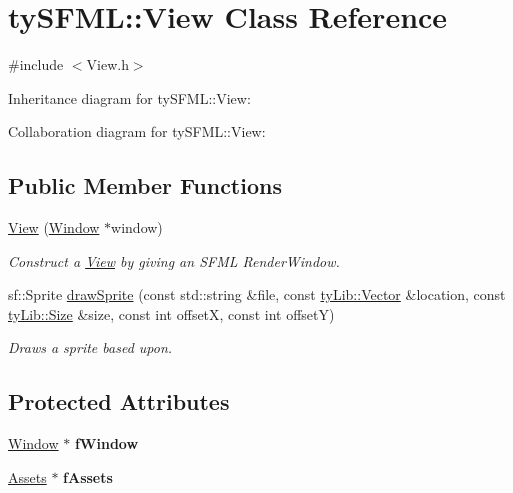 \hypertarget{classty_s_f_m_l_1_1_view}{}\section{ty\+S\+F\+M\+L\+:\+:View Class Reference}
\label{classty_s_f_m_l_1_1_view}


{\ttfamily \#include $<$View.\+h$>$}



Inheritance diagram for ty\+S\+F\+M\+L\+:\+:View\+:


Collaboration diagram for ty\+S\+F\+M\+L\+:\+:View\+:
\subsection*{Public Member Functions}
\begin{DoxyCompactItemize}
\item 
\hypertarget{classty_s_f_m_l_1_1_view_aa3e1b67002328cf57ef8cb55e259bca3}{}\hyperlink{classty_s_f_m_l_1_1_view_aa3e1b67002328cf57ef8cb55e259bca3}{View} (\hyperlink{classty_s_f_m_l_1_1_window}{Window} $\ast$window)\label{classty_s_f_m_l_1_1_view_aa3e1b67002328cf57ef8cb55e259bca3}

\begin{DoxyCompactList}\small\item\em Construct a \hyperlink{classty_s_f_m_l_1_1_view}{View} by giving an S\+F\+M\+L Render\+Window. \end{DoxyCompactList}\item 
sf\+::\+Sprite \hyperlink{classty_s_f_m_l_1_1_view_aa891dcbf5bcc39c3230bdd39b95aa543}{draw\+Sprite} (const std\+::string \&file, const \hyperlink{classty_lib_1_1_vector}{ty\+Lib\+::\+Vector} \&location, const \hyperlink{classty_lib_1_1_size}{ty\+Lib\+::\+Size} \&size, const int offset\+X, const int offset\+Y)
\begin{DoxyCompactList}\small\item\em Draws a sprite based upon. \end{DoxyCompactList}\end{DoxyCompactItemize}
\subsection*{Protected Attributes}
\begin{DoxyCompactItemize}
\item 
\hypertarget{classty_s_f_m_l_1_1_view_a7cd7d980d062fc2123510e75aa3be6fd}{}\hyperlink{classty_s_f_m_l_1_1_window}{Window} $\ast$ {\bfseries f\+Window}\label{classty_s_f_m_l_1_1_view_a7cd7d980d062fc2123510e75aa3be6fd}

\item 
\hypertarget{classty_s_f_m_l_1_1_view_a4779b13a556942cfc4f25e70bac7322a}{}\hyperlink{classty_s_f_m_l_1_1_assets}{Assets} $\ast$ {\bfseries f\+Assets}\label{classty_s_f_m_l_1_1_view_a4779b13a556942cfc4f25e70bac7322a}

\end{DoxyCompactItemize}


